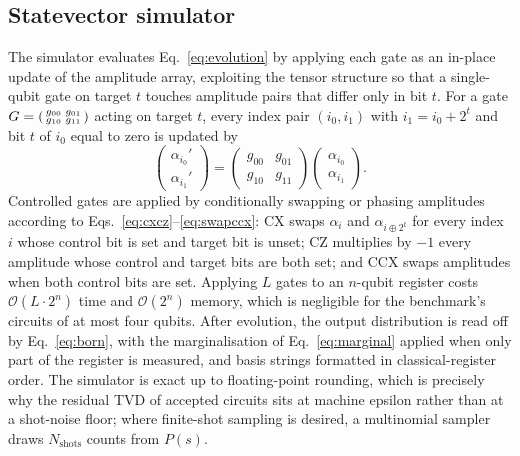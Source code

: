 \documentclass[11pt,a4paper]{article}
\begin{document}
\subsection{Statevector simulator}
The simulator evaluates Eq.~\eqref{eq:evolution} by applying each gate as an in-place update of the amplitude array, exploiting the tensor structure so that a single-qubit gate on target $t$ touches amplitude pairs that differ only in bit $t$. For a gate $G=\begin{psmallmatrix}g_{00}&g_{01}\\g_{10}&g_{11}\end{psmallmatrix}$ acting on target $t$, every index pair $(i_0,i_1)$ with $i_1=i_0+2^{t}$ and bit $t$ of $i_0$ equal to zero is updated by
\begin{equation}
\begin{pmatrix}\alpha_{i_0}'\\ \alpha_{i_1}'\end{pmatrix}
=\begin{pmatrix}g_{00}&g_{01}\\ g_{10}&g_{11}\end{pmatrix}
\begin{pmatrix}\alpha_{i_0}\\ \alpha_{i_1}\end{pmatrix}.
\label{eq:singleupdate}
\end{equation}
Controlled gates are applied by conditionally swapping or phasing amplitudes according to Eqs.~\eqref{eq:cxcz}--\eqref{eq:swapccx}: $\mathrm{CX}$ swaps $\alpha_i$ and $\alpha_{i\oplus 2^{t}}$ for every index $i$ whose control bit is set and target bit is unset; $\mathrm{CZ}$ multiplies by $-1$ every amplitude whose control and target bits are both set; and $\mathrm{CCX}$ swaps amplitudes when both control bits are set. Applying $L$ gates to an $n$-qubit register costs $\mathcal{O}(L\cdot 2^{n})$ time and $\mathcal{O}(2^{n})$ memory, which is negligible for the benchmark's circuits of at most four qubits. After evolution, the output distribution is read off by Eq.~\eqref{eq:born}, with the marginalisation of Eq.~\eqref{eq:marginal} applied when only part of the register is measured, and basis strings formatted in classical-register order. The simulator is exact up to floating-point rounding, which is precisely why the residual TVD of accepted circuits sits at machine epsilon rather than at a shot-noise floor; where finite-shot sampling is desired, a multinomial sampler draws $N_{\mathrm{shots}}$ counts from $P(s)$.
\end{document}
